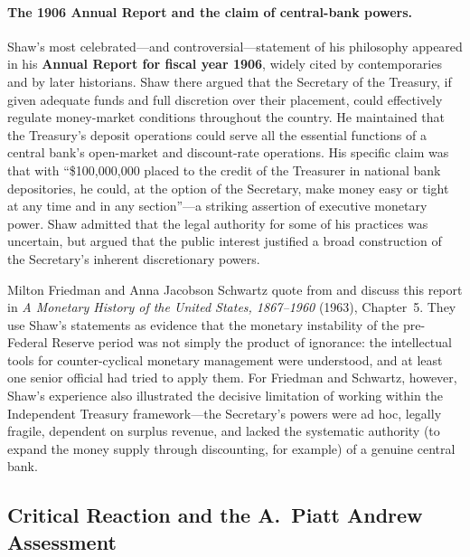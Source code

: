 \documentclass[12pt]{article}
\begin{document}
\paragraph{The 1906 Annual Report and the claim of central-bank
powers.}
Shaw's most celebrated---and controversial---statement of his
philosophy appeared in his \textbf{Annual Report for fiscal year
1906}, widely cited by contemporaries and by later historians.
Shaw there argued that the Secretary of the Treasury, if given
adequate funds and full discretion over their placement, could
effectively regulate money-market conditions throughout the country.
He maintained that the Treasury's deposit operations could serve all
the essential functions of a central bank's open-market and
discount-rate operations.  His specific claim was that with
``\$100{,}000{,}000 placed to the credit of the Treasurer in
national bank depositories, he could, at the option of the
Secretary, make money easy or tight at any time and in any
section''---a striking assertion of executive monetary power.
Shaw admitted that the legal authority for some of his practices was
uncertain, but argued that the public interest justified a broad
construction of the Secretary's inherent discretionary powers.

Milton Friedman and Anna Jacobson Schwartz quote from and discuss
this report in \emph{A Monetary History of the United States,
1867--1960} (1963), Chapter~5.  They use Shaw's statements as
evidence that the monetary instability of the pre-Federal Reserve
period was not simply the product of ignorance: the intellectual
tools for counter-cyclical monetary management were understood, and
at least one senior official had tried to apply them.  For Friedman
and Schwartz, however, Shaw's experience also illustrated the
decisive limitation of working within the Independent Treasury
framework---the Secretary's powers were ad hoc, legally fragile,
dependent on surplus revenue, and lacked the systematic authority
(to expand the money supply through discounting, for example) of a
genuine central bank.

\subsection{Critical Reaction and the A.\ Piatt Andrew Assessment}
\end{document}
